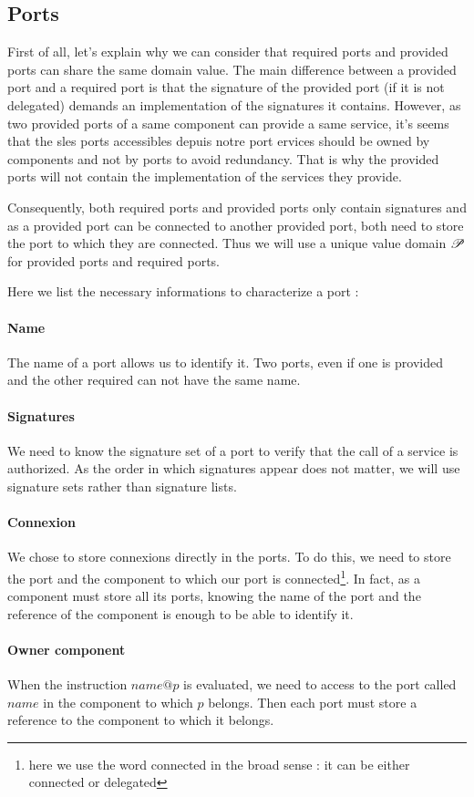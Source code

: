 \subsection{Ports}
\label{value_ports}
First of all, let's explain why we can consider that required ports and provided ports can share the same domain value. The main difference between a provided port and a required port is that the signature of the provided port (if it is not delegated) demands an implementation of the signatures it contains. However, as two provided ports of a same component can provide a same service, it's seems that the sles ports accessibles depuis notre port ervices should be owned by components and not by ports to avoid redundancy. That is why the provided ports will not contain the implementation of the services they provide. 

Consequently, both required ports and provided ports only contain signatures and as a provided port can be connected to another provided port, both need to store the port to which they are connected. Thus we will use a unique value domain $\mathcal{P}$ for provided ports and required ports.
 

Here we list the necessary informations to characterize a port :
\paragraph{Name} The name of a port allows us to identify it. Two ports, even if one is provided and the other required can not have the same name. 
\paragraph{Signatures} We need to know the signature set of a port to verify that the call of a service is authorized. As the order in which signatures appear does not matter, we will use signature sets rather than signature lists.
\paragraph{Connexion}
We chose to store connexions directly in the ports. To do this, we need to store the port and the component to which our port is connected\footnote{here we use the word connected in the broad sense : it can be either connected or delegated}. In fact, as a component must store all its ports, knowing the name of the port  and the reference of the component is enough to be able to identify it.
\paragraph{Owner component}
When the instruction $name@p$ is evaluated, we need to access to the port called $name$ in the component to which $p$ belongs. Then each port must store a reference to the component to which it belongs.

